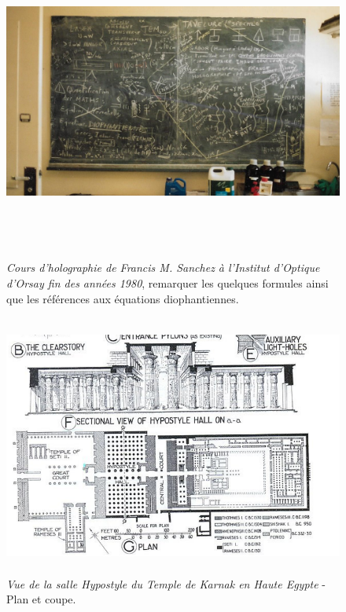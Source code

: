 \documentclass[a4paper,12pt]{article}
\begin{document}
\begin{appendix}
\begin{figure}[h]
\centering
\includegraphics[width=14.5cm,height=10.5cm]{./figures/fs-tab.png}
\caption [Cours d'holographie à l'Institut d'Optique d'Orsay]{\textit{Cours d'holographie de Francis M. Sanchez à l'Institut d'Optique d'Orsay fin des années 1980}, remarquer les quelques formules ainsi que les références aux équations diophantiennes.} 
\label{fig:3:figure3}
\end{figure}

\begin{figure}
\centering
\includegraphics[width=14.5cm,height=8.6cm]{./figures/karnak.png}
\caption [Plan du Temple de Karnak]{\textit{Vue de la salle Hypostyle du Temple de Karnak en Haute Egypte} - Plan et coupe.} 
\label{fig:4:figure4}
\end{figure}


\end{appendix}
\end{document}
